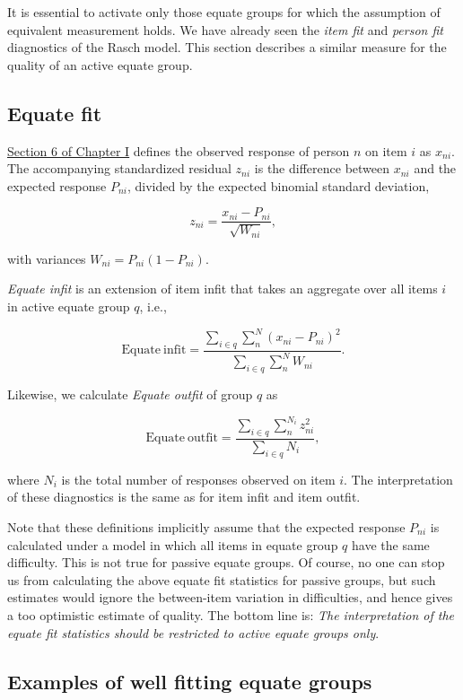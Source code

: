 \documentclass[
]{book}
\begin{document}
It is essential to activate only those equate groups for which the assumption of equivalent measurement holds. We have already seen the \emph{item fit} and \emph{person fit} diagnostics of the Rasch model. This section describes a similar measure for the quality of an active equate group.

\hypertarget{equate-fit}{%
\subsection{Equate fit}\label{equate-fit}}

\href{https://d-score.org/dbook1/ch-evaluation.html}{Section 6 of Chapter I} defines the observed response of person \(n\) on item \(i\) as \(x_{ni}\). The accompanying standardized residual \(z_{ni}\) is the difference between \(x_{ni}\) and the expected response \(P_{ni}\), divided by the expected binomial standard deviation,

\[z_{ni} = \frac{x_{ni}-P_{ni}}{\sqrt{W_{ni}}},\]

with variances \(W_{ni} = P_{ni}(1-P_{ni})\).

\emph{Equate infit} is an extension of item infit that takes an aggregate over all items \(i\) in active equate group \(q\), i.e.,

\[\mathrm{Equate\ infit} = \frac{\sum_{i\in q}\sum_{n}^N (x_{ni}-P_{ni})^2}{\sum_{i\in q}\sum_n^N W_{ni}}.\]

Likewise, we calculate \emph{Equate outfit} of group \(q\) as

\[\mathrm{Equate\ outfit} = \frac{\sum_{i\in q}\sum_{n}^{N_i} z_{ni}^2}{\sum_{i\in q} N_i},\]

where \(N_i\) is the total number of responses observed on item \(i\). The interpretation of these diagnostics is the same as for item infit and item outfit.

Note that these definitions implicitly assume that the expected response \(P_{ni}\) is calculated under a model in which all items in equate group \(q\) have the same difficulty. This is not true for passive equate groups. Of course, no one can stop us from calculating the above equate fit statistics for passive groups, but such estimates would ignore the between-item variation in difficulties, and hence gives a too optimistic estimate of quality. The bottom line is: \emph{The interpretation of the equate fit statistics should be restricted to active equate groups only}.

\hypertarget{examples-of-well-fitting-equate-groups}{%
\subsection{Examples of well fitting equate groups}\label{examples-of-well-fitting-equate-groups}}
\end{document}
